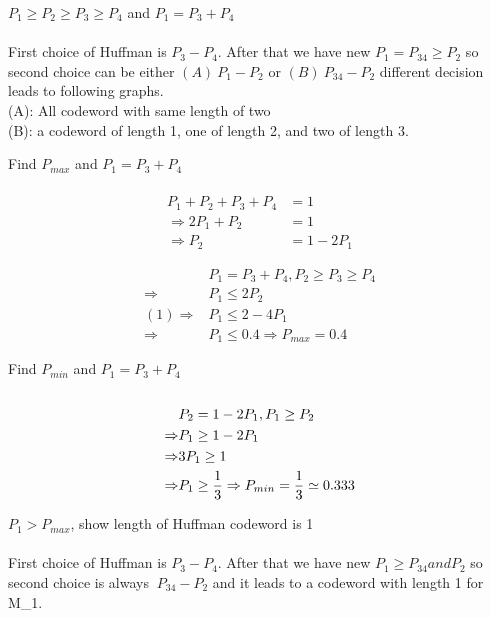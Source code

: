 \documentclass[
  course = {{EE623 Information Theory}},
  quartile = {{Fall 2020}},
  assignment = 3,
  name = {{Mohammad Mahdi Rahimi}},
  studentnumber = {{20208244}},
  email = {{mahi@kaist.ac.kr}},
  firstexercise = 1
]{aga-homework}
\begin{document}
\exercise

\subexercise $P_1 \ge P_2 \ge P_3 \ge P_4$ and $P_1 = P_3 + P_4$
\\\\
First choice of Huffman is $P_3 - P_4$. After that we have new $P_1 = P_{34} \ge P_2$ so second choice can be either $(A)\ P_1 - P_2$ or $(B)\ P_{34} - P_2$ different decision leads to following graphs.
\\
(A): All codeword with same length of two\\
(B): a codeword of length 1, one of length 2, and two of length 3.

\subexercise Find $P_{max}$ and $P_1 = P_3 + P_4$
\\\\
\begin{equation} \label{eq3}
\begin{split}
P_1 + P_2 + P_3 + P_4  & = 1\\
\Rightarrow  2P_1 + P_2 & = 1\\
\Rightarrow  P_2 & = 1 - 2P_1
\end{split}
\end{equation}

\begin{equation} \label{eq3}
\begin{split}
& P_1 = P_3 + P_4, P_2 \ge P_3 \ge P_4\\
\Rightarrow & P_1 \le 2P_2\\
(1) \Rightarrow & P_1 \le 2 - 4P_1\\
\Rightarrow & P_1 \le 0.4 \Rightarrow P_{max} = 0.4
\end{split}
\end{equation}

\subexercise Find $P_{min}$ and $P_1 = P_3 + P_4$
\\\\
\begin{equation} \label{eq3}
\begin{split}
& P_2 = 1 - 2P_1, P_1 \ge P_2\\
\Rightarrow & P_1 \ge 1 - 2P_1\\
\Rightarrow & 3P_1 \ge 1\\
\Rightarrow & P_1 \ge {1 \over 3} \Rightarrow P_{min} = {1 \over 3} \simeq 0.333
\end{split}
\end{equation}

\subexercise $P_{1} > P_{max}$, show length of Huffman codeword is 1 
\\\\
First choice of Huffman is $P_3 - P_4$. After that we have new $P_1 \ge P_{34} and P_2$ so second choice is always $\ P_{34} - P_2$ and it leads to a codeword with length 1 for M_1.
\end{document}
